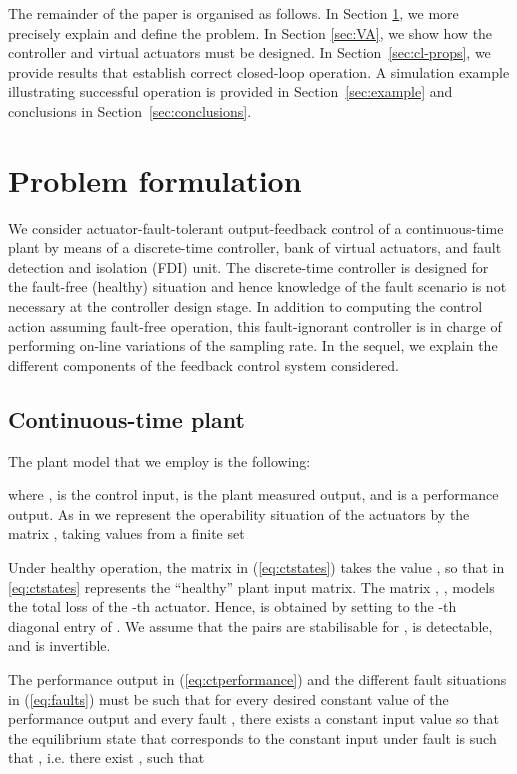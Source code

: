 \documentclass[letterpaper, 10 pt, conference]{ieeeconf}
\begin{document}
The remainder of the paper is organised as follows. In Section \ref{sec:probform}, we more precisely explain and define the problem. In Section \ref{sec:VA}, we show how the controller and virtual actuators must be designed. In Section~\ref{sec:cl-props}, we provide results that establish correct closed-loop operation. A simulation example illustrating successful operation is provided in Section~\ref{sec:example} and conclusions in Section~\ref{sec:conclusions}.


\section{Problem formulation}
\label{sec:probform}
We consider actuator-fault-tolerant output-feedback control of a
continuous-time plant by means of a discrete-time controller, bank of
virtual actuators, and fault detection and isolation (FDI) unit. The
discrete-time controller is designed for the fault-free (healthy)
situation and hence knowledge of the fault scenario is not necessary
at the controller design stage. In addition to computing the control
action assuming fault-free operation, this fault-ignorant controller
is in charge of performing on-line variations of the sampling rate. In
the sequel, we explain the different components of the feedback
control system considered.

\subsection{Continuous-time plant}
\label{sec:ct-plant}

The plant model that we employ is the following:

where ,  is the control input,  is the
plant measured output, and  is a performance output. As in
\cite{seron_bankVA_ifac11} we represent the operability situation of
the  actuators by the matrix , taking values from a
finite set

Under healthy operation, the matrix  in (\ref{eq:ctstates}) takes
the value , so that  in \eqref{eq:ctstates} represents the
``healthy'' plant input matrix. The matrix , ,
models the total loss of the -th actuator. Hence,  is obtained
by setting to  the -th diagonal entry of .  We assume that the pairs  are stabilisable for ,  is detectable, and  is invertible.

The performance output  in (\ref{eq:ctperformance}) and the
different fault situations in (\ref{eq:faults}) must be such that for
every desired constant value  of the performance output and
every fault , there exists a constant input value  so
that the equilibrium state  that corresponds to the constant
input  under fault  is such that , i.e. there exist ,  such that
\end{document}

